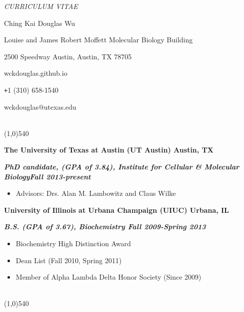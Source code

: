 \documentclass[dvips,11pt]{article}
\begin{document}
\centerline{\it \small CURRICULUM VITAE}
\vspace{2mm}
\centerline{\Large Ching Kai Douglas Wu}
\centerline{ Louise and James Robert Moffett Molecular Biology Building}
\centerline{2500 Speedway Austin, Austin, TX 78705}
\centerline{wckdouglas.github.io}
\centerline{\texttt{+}1 (310) 658-1540}
\centerline{wckdouglas@utexas.edu}
\vspace{.5mm}

 \vspace{-2.5mm}
\\\noindent \line(1,0){540}\\
\noindent \centerline{\bf The University of Texas at Austin (UT Austin) \hfill Austin, TX}
\noindent \centerline{\textit{\textbf{PhD candidate, (GPA of 3.84), Institute for Cellular \& Molecular Biology\hfill Fall 2013-present}}}
\vspace{-6mm}
\begin{spacing}{0.1}
\begin{itemize} \parskip 0pt \parsep 0pt
	\setlength{\itemsep}{1pt}
	\item Advisors: Drs. Alan M. Lambowitz and Claus Wilke
	\end{itemize}
\end{spacing}
\vspace{4mm}
\noindent \centerline{\bf University of Illinois at Urbana Champaign (UIUC) \hfill Urbana, IL}
\noindent \centerline{{\textit{\textbf{B.S. (GPA of 3.67), Biochemistry \hfill Fall 2009-Spring 2013}}}}
\begin{spacing}{0.1}
\vspace{-2.5mm}
\begin{itemize} \itemsep 1pt \parskip 0pt \parsep 0pt
	\setlength{\itemsep}{0pt}
	\item Biochemistry High Distinction Award
	\item Dean List (Fall 2010, Spring 2011)
	\item Member of Alpha Lambda Delta Honor Society (Since 2009)
	\end{itemize}
\end{spacing}
\vspace{+4mm}

 \vspace{-2mm}
\\\noindent \line(1,0){540}\\
\vspace{-5mm}
\end{document}
